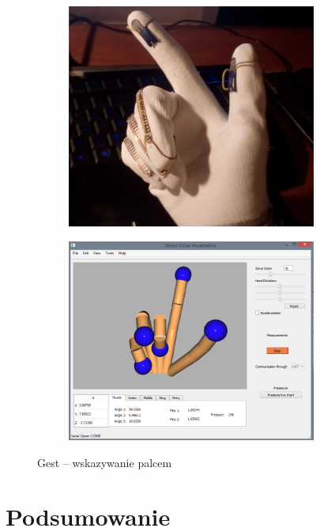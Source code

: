 \documentclass[12pt,a4paper]{article}
\begin{document}
\begin{figure}[!htb]
\centering
    \begin{subfigure}{.5\textwidth}
      \includegraphics[width=0.9\textwidth]{./images/Point.jpg}
     \end{subfigure}%
    \begin{subfigure}{.5\textwidth}
      \includegraphics[width=0.9\textwidth]{./images/PointQt.png}
     \end{subfigure}
    \caption{Gest -- wskazywanie palcem \label{fig:Point}}
\end{figure}

\newpage
\section{Podsumowanie}
\end{document}

